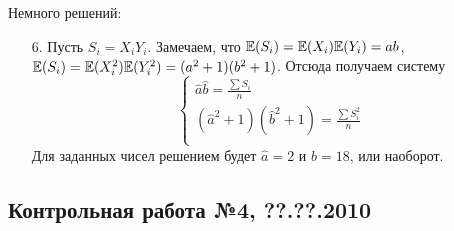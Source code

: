\documentclass[12pt, a4paper]{article}\usepackage[]{graphicx}\usepackage[]{color}
\begin{document}
	Немного решений:

	\begin{enumerate}
		\item[6.] Пусть $S_i = X_i Y_i$. Замечаем, что $\mathbb{E}(S_i)=\mathbb{E}(X_i)\mathbb{E}(Y_i)=ab$, $\mathbb{E}(S_i)=\mathbb{E}(X_i^2)\mathbb{E}(Y_i^2)=(a^2+1)(b^2+1)$. Отсюда получаем систему
		\[
		\begin{cases}
		\hat a \hat b = \frac{\sum S_i}{n} \\
		(\hat a^2 + 1) (\hat b^2 + 1) = \frac{\sum S_i^2}{n} \\
		\end{cases}
		\]
		Для заданных чисел решением будет $\hat a = 2$ и $\hat b = 18$, или наоборот.
	\end{enumerate}



	\subsection{Контрольная работа №4, ??.??.2010}
\end{document}
